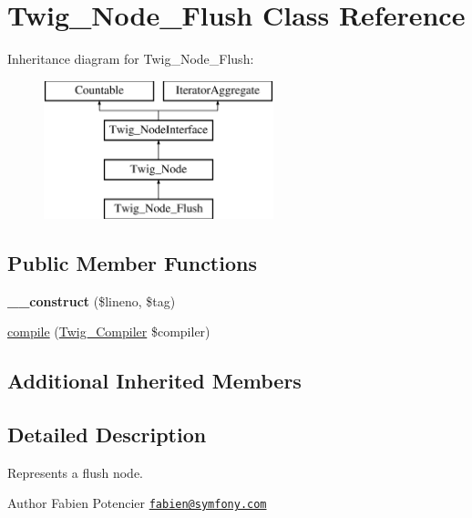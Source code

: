 \hypertarget{class_twig___node___flush}{}\section{Twig\+\_\+\+Node\+\_\+\+Flush Class Reference}
\label{class_twig___node___flush}
Inheritance diagram for Twig\+\_\+\+Node\+\_\+\+Flush\+:\begin{figure}[H]
\begin{center}
\leavevmode
\includegraphics[height=4.000000cm]{class_twig___node___flush}
\end{center}
\end{figure}
\subsection*{Public Member Functions}
\begin{DoxyCompactItemize}
\item 
\hypertarget{class_twig___node___flush_a5e1f46c5aa1e5e46a8b68df0c28f0e04}{}{\bfseries \+\_\+\+\_\+construct} (\$lineno, \$tag)\label{class_twig___node___flush_a5e1f46c5aa1e5e46a8b68df0c28f0e04}

\item 
\hyperlink{class_twig___node___flush_a4e0faa87c3fae583620b84d3607085da}{compile} (\hyperlink{class_twig___compiler}{Twig\+\_\+\+Compiler} \$compiler)
\end{DoxyCompactItemize}
\subsection*{Additional Inherited Members}


\subsection{Detailed Description}
Represents a flush node.

\begin{DoxyAuthor}{Author}
Fabien Potencier \href{mailto:fabien@symfony.com}{\tt fabien@symfony.\+com} 
\end{DoxyAuthor}


